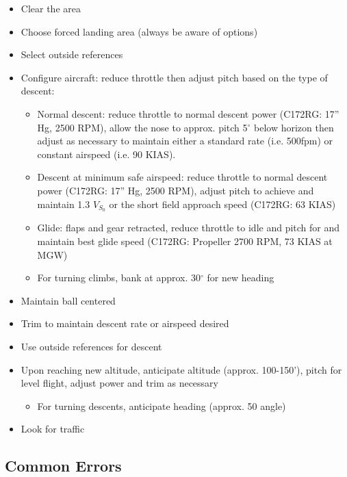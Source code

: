 \begin{itemize}
  \item Clear the area
  \item Choose forced landing area (always be aware of options) 
  \item Select outside references
  \item Configure aircraft: reduce throttle then adjust pitch based on the type
    of descent:
    \begin{itemize}
      \item Normal descent: reduce throttle to normal descent power (C172RG:
        17'' Hg, 2500 RPM), allow the nose to approx. pitch 5$^\circ$ below
        horizon then adjust as necessary to maintain either a standard rate
        (i.e.  500fpm) or constant airspeed (i.e. 90 KIAS). 
      \item Descent at minimum safe airspeed: reduce throttle to normal descent
        power (C172RG: 17'' Hg, 2500 RPM), adjust pitch to achieve and maintain
        1.3 $V_{S_0}$ or the short field approach speed (C172RG: 63 KIAS)
      \item Glide: flaps and gear retracted, reduce throttle to idle and pitch
        for and maintain best glide speed (C172RG: Propeller 2700 RPM, 73 KIAS
        at MGW)
      \item For turning climbs, bank at approx. 30$^\circ$ for new heading
    \end{itemize}
  \item Maintain ball centered
  \item Trim to maintain descent rate or airspeed desired
  \item Use outside references for descent
  \item Upon reaching new altitude, anticipate altitude (approx. 100-150'),
    pitch for level flight, adjust power and trim as necessary
    \begin{itemize}
      \item For turning descents, anticipate heading (approx. 50%
        angle)
    \end{itemize}
  \item Look for traffic
\end{itemize}

\subsection{Common Errors}

